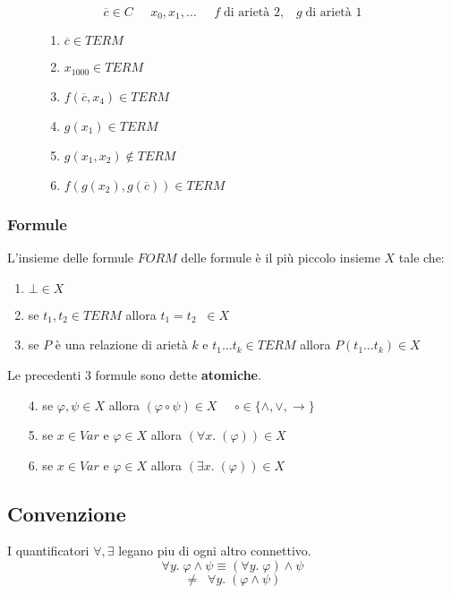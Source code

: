 \documentclass{article}
\theoremstyle{break}
\theoremstyle{break}
\theoremstyle{break}
\theoremstyle{break}
\begin{document}
\begin{figure}[H]
  \begin{example}
    \[
      \overline{c} \in C\;\;\;\;\; x_0, x_1, \ldots \;\;\;\;\; f\; \text{di arietà 2}, \;\;\; g\; \text{di arietà 1}
    \] 
    \begin{enumerate}
      \item \( \overline{c} \in TERM \) 
      \item \( x_{1000} \in TERM \) 
      \item \( f(\overline{c}, x_4) \in TERM\) 
      \item \( g(x_1) \in TERM \) 
      \item  \( g(x_1, x_2) \notin TERM \) 
      \item \( f(g(x_2), g(\overline{c})) \in TERM \) 
    \end{enumerate}
  \end{example}
\end{figure}

\subsubsection{Formule}
L'insieme delle formule \( FORM \) delle formule è il più piccolo insieme \( X \) tale che:
\begin{enumerate}
  \item \( \bot \in X \) 
  \item se \( t_1,t_2 \in TERM \) allora \( t_1 = t_2\;\; \in X \) 
  \item se \( P \) è una relazione di arietà \( k \) e \( t_1 \ldots t_k \in TERM \) allora \( P(t_1 \ldots t_k) \in X \)
\end{enumerate}
Le precedenti 3 formule sono dette \textbf{atomiche}. 
\begin{enumerate}
  \item [4.] se \( \varphi, \psi \in X \) allora \( (\varphi \circ \psi) \in X \;\;\;\;\; \circ \in  \{\wedge, \vee, \to \} \) 
  \item [5.] se \( x \in Var \) e \( \varphi \in X \) allora \( (\forall x.\; (\varphi)) \in X \) 
  \item [6.] se \( x \in Var \) e \( \varphi \in X \) allora \( (\exists x.\; (\varphi)) \in X \) 
\end{enumerate}

\subsection{Convenzione}
I quantificatori \( \forall , \exists  \) legano piu di ogni altro connettivo.
\[
  \forall y.\; \varphi \wedge \psi \equiv (\forall y.\; \varphi) \wedge \psi
\] 
\[
  \neq \;\; \forall y.\; (\varphi \wedge \psi)
\] 
\end{document}
